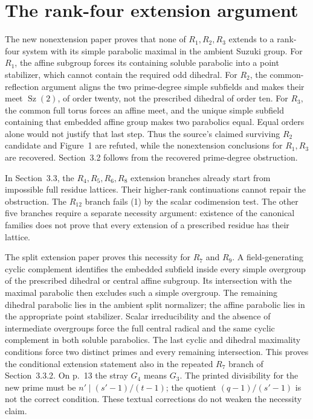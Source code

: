 \documentclass[11pt,a4paper]{article}
\newcommand{\Sz}{\operatorname{Sz}}
\begin{document}
\section{The rank-four extension argument}
The new nonextension paper proves that none of $R_1,R_2,R_3$ extends
to a rank-four system with its simple parabolic maximal in the ambient
Suzuki group. For $R_1$, the affine subgroup forces its containing
soluble parabolic into a point stabilizer, which cannot contain the
required odd dihedral. For $R_2$, the common-reflection argument aligns
the two prime-degree simple subfields and makes their meet $\Sz(2)$,
of order twenty, not the prescribed dihedral of order ten.
For $R_3$, the common full torus forces an affine meet, and the unique
simple subfield containing that embedded affine group makes two
parabolics equal. Equal orders alone would not justify that last step.
Thus the source's claimed surviving $R_2$ candidate and Figure~1 are
refuted, while the nonextension conclusions for $R_1,R_3$ are recovered.
Section~3.2 follows from the recovered prime-degree obstruction.

In Section~3.3, the $R_4,R_5,R_6,R_8$ extension branches already start
from impossible full residue lattices. Their higher-rank continuations
cannot repair the obstruction. The $R_{12}$ branch fails (1) by the
scalar codimension test. The other five branches require a separate
necessity argument: existence of the canonical families does not prove
that every extension of a prescribed residue has their lattice.

The split extension paper proves this necessity for $R_7$ and $R_9$.
A field-generating cyclic complement identifies the embedded subfield
inside every simple overgroup of the prescribed dihedral or central
affine subgroup. Its intersection with the maximal parabolic then
excludes such a simple overgroup. The remaining dihedral parabolic lies
in the ambient split normalizer; the affine parabolic lies in the
appropriate point stabilizer. Scalar irreducibility and the absence of
intermediate overgroups force the full central radical and the same
cyclic complement in both soluble parabolics. The last cyclic and
dihedral maximality conditions force two distinct primes and every
remaining intersection. This proves the conditional extension statement
also in the repeated $R_7$ branch of Section~3.3.2. On p.~13 the stray
$G_4$ means $G_3$. The printed divisibility for the new prime must be
$n'\mid(s'-1)/(t-1)$; the quotient $(q-1)/(s'-1)$ is not the correct
condition. These textual corrections do not weaken the necessity claim.
\end{document}
